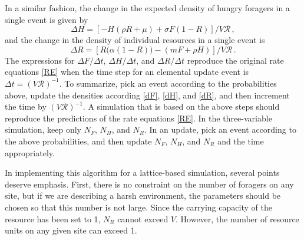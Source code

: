 \documentclass[11pt]{iopart}
\begin{document}
In a similar fashion, the change in the expected density of hungry foragers in
a single event is given by
\begin{equation}
\label{dH}
  \Delta H =\left[-H(\rho R+\mu)+\sigma F(1-R)\right]/V\mathcal{R}\,,
\end{equation}
and the change in the density of individual resources in a single event is
\begin{equation}
\label{dR}
  \Delta R =\left[R\big(\alpha(1-R)\big)-(mF+\rho H)\right]/V\mathcal{R}\,.
\end{equation}
The expressions for $\Delta F/\Delta t$, $\Delta H/\Delta t$, and
$\Delta R/\Delta t$ reproduce the original rate equations \eqref{RE} when the
time step for an elemental update event is $\Delta t = (V\mathcal{R})^{-1}$.
To summarize, pick an event according to the probabilities above, update the
densities according \eqref{dF}, \eqref{dH}, and \eqref{dR}, and then
increment the time by $(V\mathcal{R})^{-1}$.  A simulation that is based on
the above steps should reproduce the predictions of the rate equations
\eqref{RE}.  In the three-variable simulation, keep only $N_F$, $N_H$, and
$N_R$.  In an update, pick an event according to the above probabilities, and
then update $N_F$, $N_H$, and $N_R$ and the time appropriately.

In implementing this algorithm for a lattice-based simulation, several points
deserve emphasis.  First, there is no constraint on the number of foragers on
any site, but if we are describing a harsh environment, the parameters should
be chosen so that this number is not large.  Since the carrying capacity of
the resource has been set to 1, $N_R$ cannot exceed $V$.  However, the number
of resource units on any given site can exceed 1.  
\end{document}
